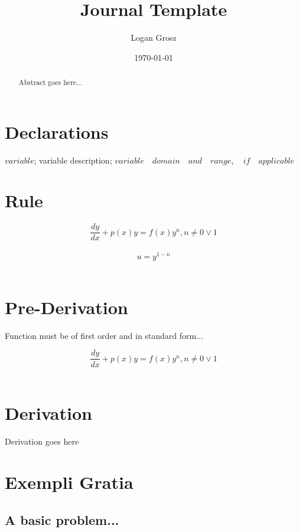\documentclass{article}
\begin{document}
	
\author{Logan Grosz}
\title{Journal Template}
\date{\today}

\maketitle

\begin{abstract}
	Abstract goes here...
\end{abstract}

\section{Declarations}

$variable$; variable description; $variable\quad domain\quad and\quad range,\quad if\quad applicable$

\section{Rule}

$$\dfrac{dy}{dx}+p(x)y=f(x)y^n,n\ne0\vee1$$\\
$$u=y^{1-n}$$\\

\section{Pre-Derivation}
Function must be of first order and in standard form...

$$\dfrac{dy}{dx}+p(x)y=f(x)y^n,n\ne0\vee1$$\\

\section{Derivation}

Derivation goes here

\section{Exempli Gratia}

\subsection{A basic problem...}
\end{document}
